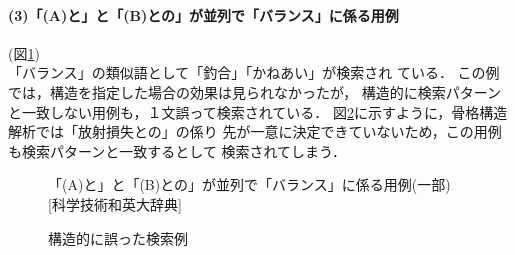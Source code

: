 \paragraph{(3)「(A)と」と「(B)との」が並列で「バランス」に係る用例}(図\ref{example3}) \\
\hspace*{1em}「バランス」の類似語として「釣合」「かねあい」が検索され
ている．
この例では，構造を指定した場合の効果は見られなかったが，
構造的に検索パターンと一致しない用例も，１文誤って検索されている．
図\ref{bad-search}に示すように，骨格構造解析では「放射損失との」の係り
先が一意に決定できていないため，この用例も検索パターンと一致するとして
検索されてしまう．

\begin{figure}[htb]
\begin{center}
\vspace{-5mm}
\noindent{}
\caption{「(A)と」と「(B)との」が並列で「バランス」に係る用例(一部)
[科学技術和英大辞典]}
\label{example3}
\end{center}
\end{figure}

\begin{figure}[htb]
\begin{center}
\vspace{-10mm}
  
\caption{構造的に誤った検索例}
\vspace{-10mm}
\label{bad-search}
\end{center}
\end{figure}

